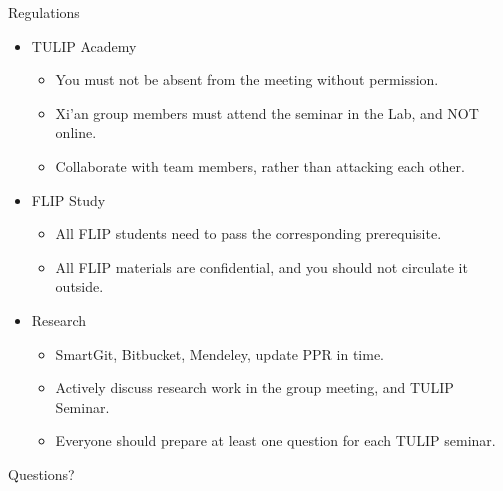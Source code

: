 \documentclass[
 size=14pt,
 paper=smartboard,  %
 mode=present, 		%
 display=slides, 	%
 style=tuliplab,  	%
 pauseslide,
 fleqn,leqno]{powerdot}
\begin{document}
\begin{slide}{Regulations}

\begin{center}
\begin{itemize}

\item<1->
{TULIP Academy}

\begin{itemize}
\item
You must not be absent from the meeting without permission.

\item
Xi'an group members must attend the seminar in the Lab,
and NOT online.

\item
Collaborate with team members, rather than attacking each other.
\end{itemize}

\item<2->
{FLIP Study}

\begin{itemize}
\item
All FLIP students need to pass the corresponding prerequisite.

\item
All FLIP materials are confidential, and you should not circulate it outside.
\end{itemize}

\item<3->
{Research}

\begin{itemize}
\item
SmartGit, Bitbucket, Mendeley, update PPR in time.

\item
Actively discuss research work in the group meeting, and TULIP Seminar.

\item
Everyone should prepare at least one question for each TULIP seminar.
\end{itemize}
\end{itemize}
\end{center}

\end{slide}


%
\begin{slide}[toc=,bm=]{Questions?}



\end{slide}
\end{document}
